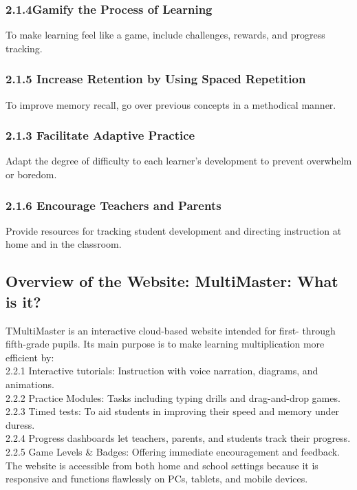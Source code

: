 \documentclass[BTech]{audiss}
\begin{document}
\subsubsection{2.1.4Gamify the Process of Learning}
To make learning feel like a game, include challenges, rewards, and progress tracking.

\subsubsection{2.1.5 Increase Retention by Using Spaced Repetition}
To improve memory recall, go over previous concepts in a methodical manner.

\subsubsection{2.1.3 Facilitate Adaptive Practice}
Adapt the degree of difficulty to each learner's development to prevent overwhelm or boredom.

\subsubsection{2.1.6 Encourage Teachers and Parents}
Provide resources for tracking student development and directing instruction at home and in the classroom.

\subsection{Overview of the Website: MultiMaster: What is it?}
TMultiMaster is an interactive cloud-based website intended for first- through fifth-grade pupils. Its main purpose is to make learning multiplication more efficient by:\\
2.2.1 Interactive tutorials: Instruction with voice narration, diagrams, and animations. \\
2.2.2 Practice Modules: Tasks including typing drills and drag-and-drop games. \\
2.2.3 Timed tests: To aid students in improving their speed and memory under duress. \\
2.2.4 Progress dashboards let teachers, parents, and students track their progress. \\
2.2.5 Game Levels & Badges: Offering immediate encouragement and feedback.\\

The website is accessible from both home and school settings because it is responsive and functions flawlessly on PCs, tablets, and mobile devices.
\end{document}
